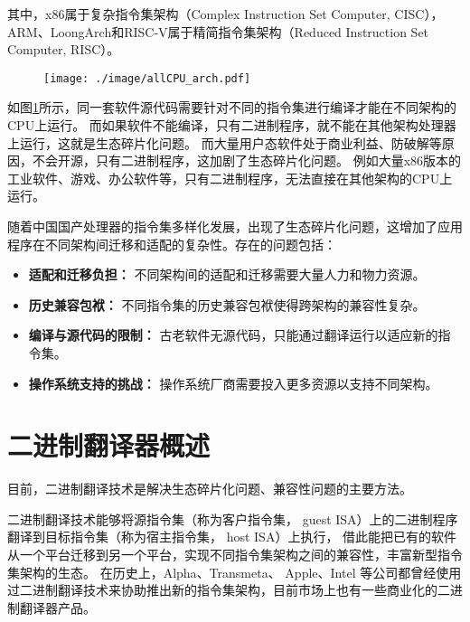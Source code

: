 其中，x86属于复杂指令集架构（Complex Instruction Set Computer, CISC），
ARM、LoongArch和RISC-V属于精简指令集架构（Reduced Instruction Set Computer, RISC）。

\begin{figure}[!htbp]
    \centering
    \texttt{[image: ./image/allCPU\_arch.pdf]}
    \label{img:allCPU_arch}
  \end{figure}


如图\ref{img:allCPU_arch}所示，同一套软件源代码需要针对不同的指令集进行编译才能在不同架构的CPU上运行\footnotemark。
而如果软件不能编译，只有二进制程序，就不能在其他架构处理器上运行，这就是生态碎片化问题。
而大量用户态软件处于商业利益、防破解等原因，不会开源，只有二进制程序，这加剧了生态碎片化问题。
例如大量x86版本的工业软件、游戏、办公软件等，只有二进制程序，无法直接在其他架构的CPU上运行。


随着中国国产处理器的指令集多样化发展，出现了生态碎片化问题，这增加了应用程序在不同架构间迁移和适配的复杂性。存在的问题包括：
    \begin{itemize}
    \item \textbf{适配和迁移负担：} 不同架构间的适配和迁移需要大量人力和物力资源。
    
    \item \textbf{历史兼容包袱：} 不同指令集的历史兼容包袱使得跨架构的兼容性复杂。
    
    \item \textbf{编译与源代码的限制：} 古老软件无源代码，只能通过翻译运行以适应新的指令集。
    
    \item \textbf{操作系统支持的挑战：} 操作系统厂商需要投入更多资源以支持不同架构。
    \end{itemize}

\section{二进制翻译器概述}
目前，二进制翻译技术是解决生态碎片化问题、兼容性问题的主要方法。

二进制翻译技术能够将源指令集（称为客户指令集， guest ISA）上的二进制程序翻译到目标指令集（称为宿主指令集， host ISA）上执行，
借此能把已有的软件从一个平台迁移到另一个平台，实现不同指令集架构之间的兼容性，丰富新型指令集架构的生态。
在历史上，Alpha\cite{chernoffFX32Profiledirected1998}、Transmeta\cite{dehnertTransmetaCodeMorphing2003}、
Apple\cite{RunningIntelBinaries}、Intel\cite{noauthor_intel_nodate}
等公司都曾经使用过二进制翻译技术来协助推出新的指令集架构，目前市场上也有一些商业化的二进制翻译器产品。

